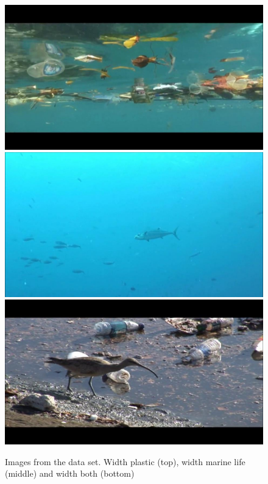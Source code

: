 \documentclass[a4paper, 12pt]{article}
\begin{document}
\begin{figure}[h!bt]
\centering
\includegraphics[keepaspectratio=true,width=.5\textwidth]{images/10947_01.jpg}\\
\includegraphics[keepaspectratio=true,width=.5\textwidth]{images/19358_10.jpg}\\
\includegraphics[keepaspectratio=true,width=.5\textwidth]{images/9077_11.jpg}
\caption{Images from the data set. Width plastic (top), width marine life (middle) and width both (bottom)}
\label{fig:plastic-data}
\end{figure}

\vfill


\end{document}
